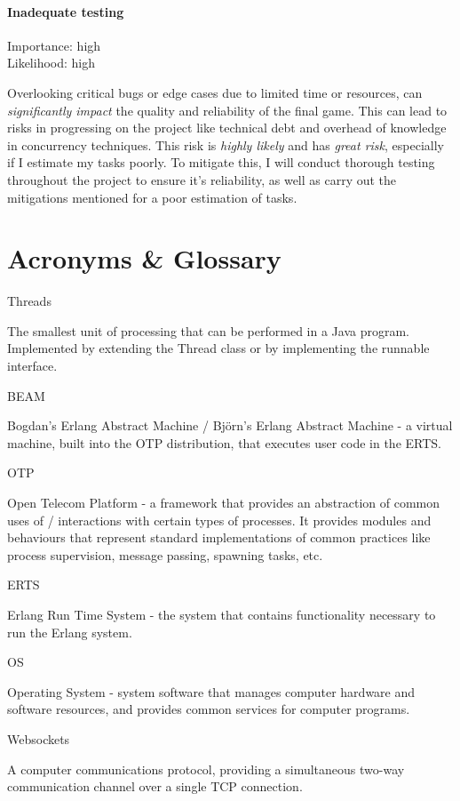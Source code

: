 \documentclass[]{project_plan}
\begin{document}
\subsubsection{Inadequate testing}
Importance: high\\
Likelihood: high

Overlooking critical bugs or edge cases due to limited time or resources, can \textit{significantly impact} the quality
and reliability of the final game. This can lead to risks in progressing on the project like technical debt
and overhead of knowledge in concurrency techniques. This risk is \textit{highly likely} and has \textit{great risk}, especially
if I estimate my tasks poorly. To mitigate this, I will conduct thorough testing throughout
the project to ensure it's reliability, as well as carry out the mitigations mentioned for a poor estimation
of tasks.


\chapter{Acronyms \& Glossary}

Threads

The smallest unit of processing that can be performed in a Java program. Implemented by extending the
Thread class or by implementing the runnable interface.

BEAM

Bogdan's Erlang Abstract Machine / Björn's Erlang Abstract Machine - a virtual machine, built into the OTP
distribution, that executes user code in the ERTS.

OTP

Open Telecom Platform - a framework that provides an abstraction of common uses of / interactions with
certain types of processes. It provides modules and behaviours that represent standard implementations of
common practices like process supervision, message passing, spawning tasks, etc.

ERTS

Erlang Run Time System - the system that contains functionality necessary to run the Erlang system.

OS

Operating System - system software that manages computer hardware and software resources, and
provides common services for computer programs.

Websockets

A computer communications protocol, providing a simultaneous two-way communication channel
over a single TCP connection.
\end{document}
